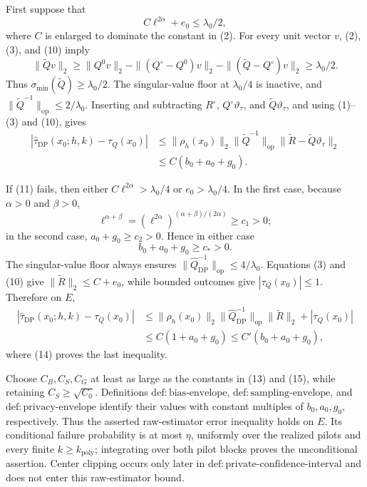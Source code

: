 First suppose that
\[
 C\ell^{2\alpha}+e_0\le\lambda_0/2,
\tag{11}
\]
where \(C\) is enlarged to dominate the constant in (2).  For every unit vector \(v\), (2), (3), and (10) imply
\[
 \|\widetilde Qv\|_2
 \ge\|Q^0v\|_2-\|(Q^\circ-Q^0)v\|_2
                    -\|(\widetilde Q-Q^\circ)v\|_2
 \ge\lambda_0/2.
\tag{12}
\]
Thus \(\sigma_{\min}(\widetilde Q)\ge\lambda_0/2\).  The singular-value floor at \(\lambda_0/4\) is inactive, and
\(\|\widetilde Q^{-1}\|_{\mathrm{op}}\le2/\lambda_0\).  Inserting and subtracting \(R^\circ\), \(Q^\circ\vartheta_\tau\), and \(\widetilde Q\vartheta_\tau\), and using (1)--(3) and (10), gives
\[
 \begin{aligned}
 |\widehat\tau_{\mathrm{DP}}(x_0;h,k)-\tau_Q(x_0)|
 &\le \|\rho_h(x_0)\|_2\|\widetilde Q^{-1}\|_{\mathrm{op}}
       \|\widetilde R-\widetilde Q\vartheta_\tau\|_2\\
 &\le C(b_0+a_0+g_0).
 \end{aligned}
\tag{13}
\]

If (11) fails, then either \(C\ell^{2\alpha}>\lambda_0/4\) or \(e_0>\lambda_0/4\).  In the first case, because \(\alpha>0\) and \(\beta>0\),
\[
 \ell^{\alpha+\beta}
 =(\ell^{2\alpha})^{(\alpha+\beta)/(2\alpha)}\ge c_1>0;
\]
in the second case, \(a_0+g_0\ge c_2>0\).  Hence in either case
\[
 b_0+a_0+g_0\ge c_*>0.
\tag{14}
\]
The singular-value floor always ensures \(\|\widehat Q_{\mathrm{DP}}^{-1}\|_{\mathrm{op}}\le4/\lambda_0\).  Equations (3) and (10) give \(\|\widetilde R\|_2\le C+e_0\), while bounded outcomes give \(|\tau_Q(x_0)|\le1\).  Therefore on \(E\),
\[
 \begin{aligned}
 |\widehat\tau_{\mathrm{DP}}(x_0;h,k)-\tau_Q(x_0)|
 &\le \|\rho_h(x_0)\|_2
       \|\widehat Q_{\mathrm{DP}}^{-1}\|_{\mathrm{op}}
       \|\widetilde R\|_2+|\tau_Q(x_0)|\\
 &\le C(1+a_0+g_0)
 \le C'(b_0+a_0+g_0),
 \end{aligned}
\tag{15}
\]
where (14) proves the last inequality.

Choose \(C_B,C_S,C_G\) at least as large as the constants in (13) and (15), while retaining \(C_S\ge\sqrt{C_0}\).  Definitions \(\mathrm{def{:}bias\text{-}envelope}\), \(\mathrm{def{:}sampling\text{-}envelope}\), and \(\mathrm{def{:}privacy\text{-}envelope}\) identify their values with constant multiples of \(b_0,a_0,g_0\), respectively.  Thus the asserted raw-estimator error inequality holds on \(E\).  Its conditional failure probability is at most \(\eta\), uniformly over the realized pilots and every finite \(k\ge k_{\mathrm{poly}}\); integrating over both pilot blocks proves the unconditional assertion.  Center clipping occurs only later in \(\mathrm{def{:}private\text{-}confidence\text{-}interval}\) and does not enter this raw-estimator bound.

